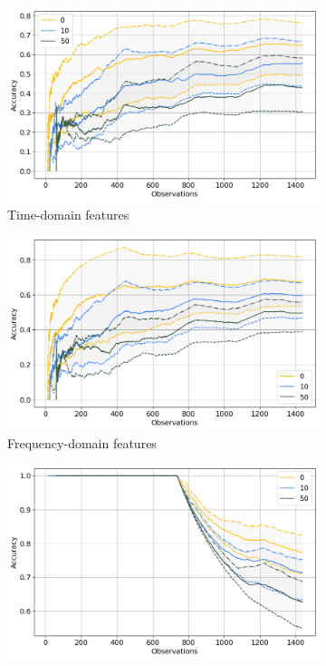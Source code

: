 \begin{figure}[]
    \centering
    \begin{subfigure}[b]{0.48\textwidth}
        \includegraphics[width=\textwidth]{assets/results/incremental-learning/skip-label-TD.png}
        \caption{Time-domain features}
    \end{subfigure}
    \hfill
    \begin{subfigure}[b]{0.48\textwidth}
        \includegraphics[width=\textwidth]{assets/results/incremental-learning/skip-label-FD.png}
        \caption{Frequency-domain features}
    \end{subfigure}
    \hfill
    \begin{subfigure}[b]{0.48\textwidth}
        \includegraphics[width=\textwidth]{assets/results/incremental-learning/skip-label-TD-severity.png}

\end{subfigure}
\end{figure}
